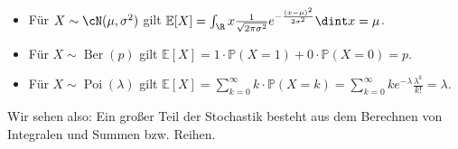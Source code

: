 \begin{beispiel}\abs
	\begin{itemize}
		\item F\"ur $X \sim \cN(\mu, \sigma^2)$ gilt $ \mathbb{E}[X] = \int_{\R} x \frac{1}{\sqrt{2\pi\sigma^2}} e^{-\frac{(x-\mu)^2}{2 \sigma^2}}\dint x = \mu$.
		\item F\"ur $X \sim \operatorname{Ber}(p)$ gilt $ \mathbb{E}[X] = 1 \cdot \mathbb{P}(X = 1) + 0 \cdot \mathbb{P}(X = 0) = p$.
		\item F\"ur $X \sim \operatorname{Poi}(\lambda)$ gilt $ \mathbb{E}[X] = \sum_{k = 0}^{\infty} k \cdot \mathbb{P}(X = k) = \sum_{k = 0}^{\infty} k e^{-\lambda} \frac{\lambda^k}{k!} = \lambda$.
	\end{itemize}
	Wir sehen also: Ein gro\ss er Teil der Stochastik besteht aus dem Berechnen von Integralen und Summen bzw. Reihen.
\end{beispiel}




